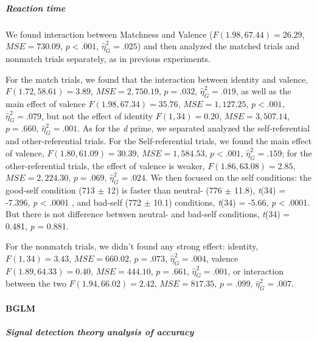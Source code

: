 \documentclass[
  english,
  man]{apa6}
\let\oldparagraph\paragraph
\renewcommand{\paragraph}[1]{\oldparagraph{#1}\mbox{}}
\let\oldsubparagraph\subparagraph
\renewcommand{\subparagraph}[1]{\oldsubparagraph{#1}\mbox{}}
\begin{document}
\hypertarget{reaction-time-4}{%
\subparagraph{Reaction time}\label{reaction-time-4}}

We found interaction between Matchness and Valence (\(F(1.98, 67.44) = 26.29\), \(\mathit{MSE} = 730.09\), \(p < .001\), \(\hat{\eta}^2_G = .025\)) and then analyzed the matched trials and nonmatch trials separately, as in previous experiments.

For the match trials, we found that the interaction between identity and valence, \(F(1.72, 58.61) = 3.89\), \(\mathit{MSE} = 2,750.19\), \(p = .032\), \(\hat{\eta}^2_G = .019\), as well as the main effect of valence \(F(1.98, 67.34) = 35.76\), \(\mathit{MSE} = 1,127.25\), \(p < .001\), \(\hat{\eta}^2_G = .079\), but not the effect of identity \(F(1, 34) = 0.20\), \(\mathit{MSE} = 3,507.14\), \(p = .660\), \(\hat{\eta}^2_G = .001\). As for the \emph{d} prime, we separated analyzed the self-referential and other-referential trials. For the Self-referential trials, we found the main effect of valence, \(F(1.80, 61.09) = 30.39\), \(\mathit{MSE} = 1,584.53\), \(p < .001\), \(\hat{\eta}^2_G = .159\); for the other-referential trials, the effect of valence is weaker, \(F(1.86, 63.08) = 2.85\), \(\mathit{MSE} = 2,224.30\), \(p = .069\), \(\hat{\eta}^2_G = .024\). We then focused on the self conditions: the good-self condition (713 \(\pm\) 12) is faster than neutral- (776 \(\pm\) 11.8), \emph{t}(34) = -7.396, \emph{p} \textless{} .0001 , and bad-self (772 \(\pm\) 10.1) conditions, \emph{t}(34) = -5.66, \emph{p} \textless{} .0001. But there is not difference between neutral- and bad-self conditions, \emph{t}(34) = 0.481, \emph{p} = 0.881.

For the nonmatch trials, we didn't found any strong effect: identity, \(F(1, 34) = 3.43\), \(\mathit{MSE} = 660.02\), \(p = .073\), \(\hat{\eta}^2_G = .004\), valence \(F(1.89, 64.33) = 0.40\), \(\mathit{MSE} = 444.10\), \(p = .661\), \(\hat{\eta}^2_G = .001\), or interaction between the two \(F(1.94, 66.02) = 2.42\), \(\mathit{MSE} = 817.35\), \(p = .099\), \(\hat{\eta}^2_G = .007\).

\hypertarget{bglm-2}{%
\paragraph{BGLM}\label{bglm-2}}

\hypertarget{signal-detection-theory-analysis-of-accuracy-4}{%
\subparagraph{Signal detection theory analysis of accuracy}\label{signal-detection-theory-analysis-of-accuracy-4}}
\end{document}
